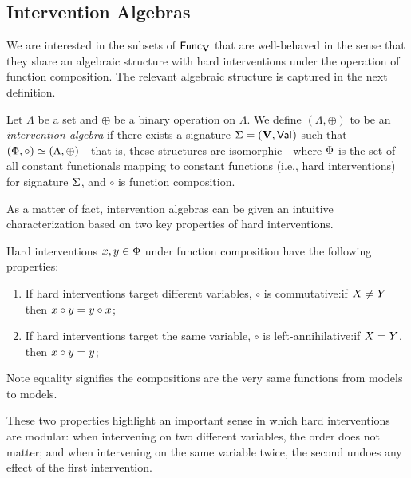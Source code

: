 \documentclass[twoside,11pt]{article}
\begin{document}
\subsection{Intervention Algebras} \label{sec:intalgebras}
 We are interested in the subsets of $\mathsf{Func}_{\mathbf{V}}$ %
 that are well-behaved in the sense that they share an algebraic structure with hard interventions under the operation of function composition. The relevant algebraic structure is captured in the next definition.

\begin{definition} Let $\Lambda$ be a set and $\oplus$ be a binary operation on $\Lambda$. We define $(\Lambda, \oplus)$ to be an \emph{intervention algebra} if there exists a signature $ \Sigma = (\mathbf{V}, \mathsf{Val}_{})$ such that $(\Phi,\circ) \simeq (\Lambda, \oplus)$---that is, these structures are isomorphic---where $\Phi$ is the set of all constant functionals mapping to constant functions (i.e., hard interventions) for signature $\Sigma$, and $\circ$ is function composition.
\end{definition}
As a matter of fact, intervention algebras can be given an intuitive characterization based on two key properties of hard interventions. 
\begin{definition}\label{keyproperties}
Hard interventions $x, y \in \Phi$  under function composition have the following properties:
\begin{enumerate}[label=(\alph*)]
    \item If hard interventions target different variables, $\circ$ is commutative:\newline if $X \neq Y$ then $x \circ y = y \circ x$; \label{keyproperty1}
    \item If hard interventions target the same variable, $\circ$ is left-annihilative:\newline if $X = Y$, then $x \circ y = y$; \label{keyproperty2}
\end{enumerate} Note equality signifies the compositions are the very same functions from models to models.
\end{definition} These two properties highlight an important sense in which hard interventions are modular: when intervening on two different variables, the order does not matter; and when intervening on the same variable twice, the second undoes any effect of the first intervention.
\end{document}
